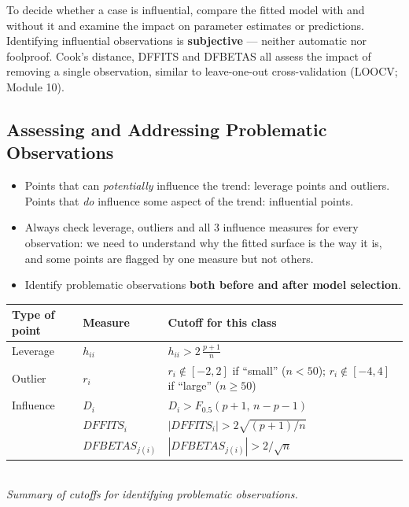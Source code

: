 \begin{remark}
    To decide whether a case is influential, compare the fitted model with and without it and
    examine the impact on parameter estimates or predictions. Identifying influential
    observations is \textbf{subjective} --- neither automatic nor foolproof. Cook's distance,
    DFFITS and DFBETAS all assess the impact of removing a single observation, similar to
    leave-one-out cross-validation (LOOCV; Module 10).
\end{remark}

\subsection{Assessing and Addressing Problematic Observations}

\begin{remark}
    \begin{itemize}
        \item Points that can \emph{potentially} influence the trend: leverage points and
        outliers. Points that \emph{do} influence some aspect of the trend: influential points.
        \item Always check leverage, outliers and all 3 influence measures for every observation:
        we need to understand why the fitted surface is the way it is, and some points are flagged
        by one measure but not others.
        \item Identify problematic observations \textbf{both before and after model selection}.
    \end{itemize}
\end{remark}

\begin{center}
    \begin{tabular}{lll}
        \toprule
        Type of point & Measure & Cutoff for this class \\
        \midrule
        Leverage & $h_{ii}$ & $h_{ii}>2\,\frac{p+1}{n}$ \\[3pt]
        Outlier & $r_i$ & $r_i\notin[-2,2]$ if ``small'' ($n<50$); $r_i\notin[-4,4]$ if ``large'' ($n\geq50$) \\[3pt]
        Influence & $D_i$ & $D_i>F_{0.5}(p+1,\,n-p-1)$ \\
        & $DFFITS_i$ & $|DFFITS_i|>2\sqrt{(p+1)/n}$ \\
        & $DFBETAS_{j(i)}$ & $|DFBETAS_{j(i)}|>2/\sqrt n$ \\
        \bottomrule
    \end{tabular}
    \\[2pt] \textit{\small Summary of cutoffs for identifying problematic observations.}
\end{center}

